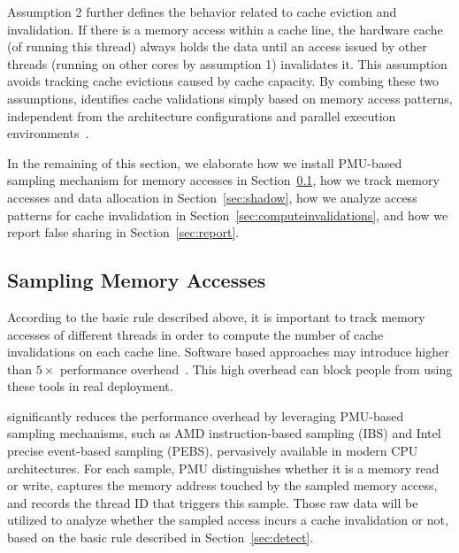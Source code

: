 Assumption 2 further defines the behavior related to cache eviction and invalidation. If there is a memory access within a cache line, the hardware cache (of running this thread) always holds the data until an access issued by other threads (running on other cores by assumption 1) invalidates it. This assumption avoids tracking cache evictions caused by cache capacity. 
By combing these two assumptions, \cheetah{} identifies cache validations simply based on memory access patterns, independent from the architecture configurations and parallel execution environments~\cite{Predator, qinzhao}. 

In the remaining of this section, we elaborate how we install PMU-based sampling mechanism for memory accesses in Section~\ref{sec:perfcounter}, how we track memory accesses and data allocation in Section~\ref{sec:shadow}, how we analyze access patterns for cache invalidation in Section~\ref{sec:computeinvalidations}, and how we report false sharing in Section~\ref{sec:report}.

\subsection{Sampling Memory Accesses}
\label{sec:perfcounter}

According to the basic rule described above, it is important to track memory accesses of different threads in order to compute the number of cache invalidations on each cache line. Software based approaches may introduce higher than $5\times$ performance overhead~\cite{Predator, qinzhao}. This high overhead can block people from using these tools in real deployment.

\cheetah{} significantly reduces the performance overhead by leveraging PMU-based sampling mechanisms, such as AMD instruction-based sampling (IBS) and Intel precise event-based sampling (PEBS), pervasively available in modern CPU architectures. 
For each sample, PMU distinguishes whether it is a memory read or write, captures the memory address touched by the sampled memory access, and records the thread ID that triggers this sample. Those raw data will be utilized to analyze whether the sampled access incurs a cache invalidation or not, based on the basic rule described in Section~\ref{sec:detect}.

